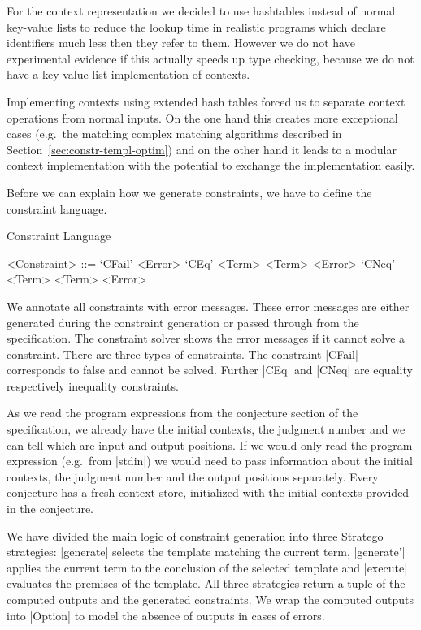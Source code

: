 For the context representation we decided to use hashtables instead of
normal key-value lists to reduce the lookup time in realistic programs
which declare identifiers much less then they refer to them. However
we do not have experimental evidence if this actually speeds up type
checking, because we do not have a key-value list implementation of
contexts.

Implementing contexts using extended hash tables forced us to separate
context operations from normal inputs. On the one hand this creates
more exceptional cases (e.g.\ the matching complex matching algorithms
described in Section~\ref{sec:constr-templ-optim}) and on the other
hand it leads to a modular context implementation with the potential
to exchange the implementation easily.

Before we can explain how we generate constraints, we have to define
the constraint language.

\begin{definition}{Constraint Language}
  \begin{grammar}
    <Constraint> ::= `CFail' <Error>
    \alt `CEq' <Term> <Term> <Error>
    \alt `CNeq' <Term> <Term> <Error>
  \end{grammar}
\end{definition}

We annotate all constraints with error messages. These error messages
are either generated during the constraint generation or passed
through from the specification. The constraint solver shows the error
messages if it cannot solve a constraint. There are three types of
constraints. The constraint \code|CFail| corresponds to false and
cannot be solved. Further \code|CEq| and \code|CNeq| are equality
respectively inequality constraints.

As we read the program expressions from the conjecture section of the
specification, we already have the initial contexts, the judgment
number and we can tell which are input and output positions. If we
would only read the program expression (e.g.\ from \code|stdin|) we
would need to pass information about the initial contexts, the
judgment number and the output positions separately. Every conjecture
has a fresh context store, initialized with the initial contexts
provided in the conjecture.

We have divided the main logic of constraint generation into three
Stratego strategies: \code|generate| selects the template matching the
current term, \code|generate'| applies the current term to the
conclusion of the selected template and \code|execute| evaluates the
premises of the template. All three strategies return a tuple of the
computed outputs and the generated constraints. We wrap the computed
outputs into \code|Option| to model the absence of outputs in cases of
errors.

